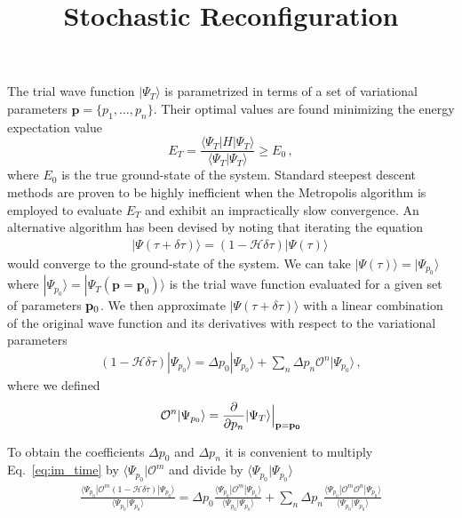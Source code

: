 \documentclass[a4paper,12pt,]{article}
\begin{document}
%
%
\title{Stochastic Reconfiguration}
\maketitle

The trial wave function $| \Psi_T \rangle $ is parametrized in terms of a set of variational parameters $\mathbf{p} = \{ p_1,\dots,p_n\}$. Their optimal values are found minimizing the energy expectation value
\begin{equation}
E_T = \frac{ \langle \Psi_T | H | \Psi_T \rangle }{\langle \Psi_T  | \Psi_T \rangle} \geq E_0\, ,
\end{equation}
where $E_0$ is the true ground-state of the system. Standard steepest descent methods are proven to be highly inefficient when the Metropolis algorithm is employed to evaluate $E_T$ and exhibit an impractically slow convergence. An alternative algorithm has been devised by noting that iterating the equation
\begin{align}
|\Psi(\tau+\delta \tau)\rangle= (1-\mathcal{H}\delta\tau) | \Psi(\tau)\rangle\, 
\end{align}
would converge to the ground-state of the system. We can take $|\Psi(\tau)\rangle =  |\Psi_{p_0}\rangle$  where $|\Psi_{p_0}\rangle = |\Psi_T(\mathbf{p} = \mathbf{p}_0)\rangle $ is the trial wave function evaluated for a given set of parameters ${\bf p}_0$. We then approximate $|\Psi(\tau+\delta\tau)\rangle$ with a linear combination of the original wave function and its derivatives with respect to the variational parameters
\begin{align}
(1-\mathcal{H}\delta \tau) |\Psi_{p_0}\rangle = \Delta p_0 |\Psi_{p_0}\rangle + \sum_n \Delta p_n \mathcal{O}^n |\Psi_{p_0}\rangle\, ,
\label{eq:im_time}
\end{align}
where we defined
\begin{equation}
\mathcal{O}^n |\Psi_{p_0} \rangle = \frac{\partial }{\partial p_n} | \Psi_T \rangle \Big|_{\bf{p} = \bf {p}_0}
\end{equation}

To obtain the coefficients $\Delta p_0$ and $\Delta p_n$ it is convenient to multiply Eq.~\eqref{eq:im_time} by  $\langle \Psi_{p_0}|\mathcal{O}^m$ and divide by $ \langle \Psi_{p_0}|\Psi_{p_0} \rangle$
\begin{align}
\frac{\langle \Psi_{p_0}|\mathcal{O}^m (1-\mathcal{H}\delta \tau) |\Psi_{p_0}\rangle }{\langle \Psi_{p_0}|\Psi_{p_0}\rangle}= \Delta p_0 \frac{ \langle \Psi_{p_0}|\mathcal{O}^m |\Psi_{p_0}\rangle }{\langle \Psi_{p_0}|\Psi_{p_0}\rangle} + \sum_n\Delta p_n \frac{ \langle \Psi_{p_0}|\mathcal{O}^m \mathcal{O}^n|\Psi_{p_0}\rangle }{\langle \Psi_{p_0}|\Psi_{p_0}\rangle}
\end{align}
\end{document}
